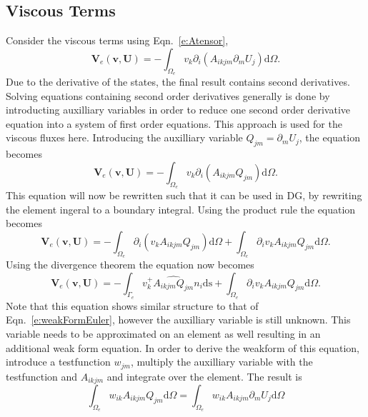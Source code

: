 \documentclass{report}
\begin{document}
\subsection{Viscous Terms}
\label{ss:ViscousTerms}
Consider the viscous terms using Eqn.~\ref{e:Atensor},
\begin{equation}
\mathbf{V}_e(\mathbf{v},\mathbf{U}) = 
- \int_{\Omega_e} v_k \partial_i ({A}_{ikjm} \partial_m U_{j}) \mathrm{d}\Omega.
\end{equation}
Due to the derivative of the states, the final result contains second derivatives. Solving equations containing second order derivatives generally is done by introducting auxilliary variables in order to reduce one second order derivative equation into a system of first order equations. This approach is used for the viscous fluxes here.
Introducing the auxilliary variable $Q_{jm} = \partial_m U_j$, the equation becomes
\begin{equation}
\mathbf{V}_e(\mathbf{v},\mathbf{U}) = 
- \int_{\Omega_e} v_k \partial_i ({A}_{ikjm} Q_{jm}) \mathrm{d}\Omega.
\end{equation}
This equation will now be rewritten such that it can be used in DG, by rewriting the element ingeral to a boundary integral. Using the product rule the equation becomes
\begin{equation}
\mathbf{V}_e(\mathbf{v},\mathbf{U}) = 
- \int_{\Omega_e} \partial_i (v_k {A}_{ikjm} Q_{jm}) \mathrm{d}\Omega
+ \int_{\Omega_e} \partial_i v_k {A}_{ikjm} Q_{jm} \mathrm{d}\Omega.
\end{equation}
Using the divergence theorem the equation now becomes
\begin{equation}
\label{e:ViscousWeakFormPart1}
\mathbf{V}_e(\mathbf{v},\mathbf{U}) = 
- \int_{\Gamma_e} v_k^{+} \widehat{{{A}_{ikjm} Q_{jm}}} n_i \mathrm{ds}
+ \int_{\Omega_e} \partial_i v_k {A}_{ikjm} Q_{jm} \mathrm{d}\Omega.
\end{equation}
Note that this equation shows similar structure to that of Eqn.~\ref{e:weakFormEuler}, however the auxilliary variable is still unknown. This variable needs to be approximated on an element as well resulting in an additional weak form equation. In order to derive the weakform of this equation, introduce a testfunction $w_{jm}$, multiply the auxilliary variable with the testfunction and $A_{ikjm}$ and integrate over the element. The result is
\begin{equation}
\int_{\Omega_e} w_{ik} A_{ikjm} Q_{jm} \mathrm{d}\Omega 
= \int_{\Omega_e} w_{ik} A_{ikjm} \partial_m U_j \mathrm{d}\Omega
\end{equation}
\end{document}
